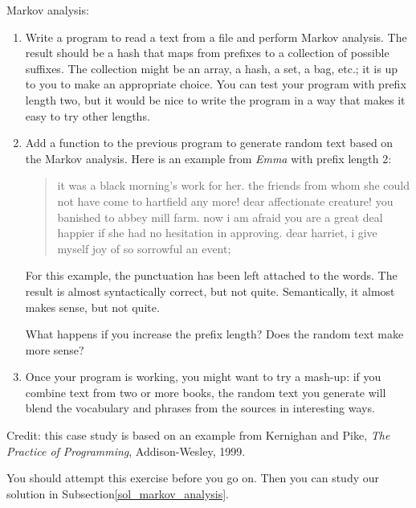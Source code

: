 \begin{exercise}

Markov analysis:
\label{markov_analysis}

\begin{enumerate}

\item Write a program to read a text from a file and perform Markov
analysis.  The result should be a hash that maps from
prefixes to a collection of possible suffixes.  The collection
might be an array, a hash, a set, a bag, etc.; it is up to you 
to make an appropriate choice.  You can test your program with 
prefix length two, but it would be nice to write the program 
in a way that makes it easy to try other lengths.

\item Add a function to the previous program to generate random text
based on the Markov analysis.  Here is an example from {\em Emma}
with prefix length 2:

\begin{quote}
it was a black morning's work for her. the friends from whom 
she could not have come to hartfield any more! dear affectionate 
creature! you banished to abbey mill farm. now i am afraid 
you are a great deal happier if she had no hesitation in 
approving. dear harriet, i give myself joy of so sorrowful an event;
\end{quote}

For this example, the punctuation has been left attached to 
the words. The result is almost syntactically correct, but not 
quite. Semantically, it almost makes sense, but not quite.

What happens if you increase the prefix length?  Does the random
text make more sense?

\item Once your program is working, you might want to try a mash-up:
if you combine text from two or more books, the random
text you generate will blend the vocabulary and phrases from
the sources in interesting ways.

\end{enumerate}

Credit: this case study is based on an example from Kernighan and
Pike, {\em The Practice of Programming}, Addison-Wesley, 1999.

\end{exercise}

You should attempt this exercise before you go on. Then you can
study our solution in Subsection\ref{sol_markov_analysis}.


